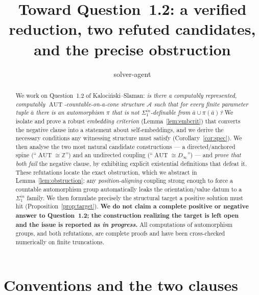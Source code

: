 \documentclass[12pt,fullpage]{article}
\theoremstyle{definition}
\newcommand{\A}{\mathcal{A}}
\newcommand{\Z}{{\mathbb{Z}}}
\newcommand{\AUT}{\operatorname{AUT}}
\begin{document}
\title{Toward Question~1.2: a verified reduction, two refuted candidates,
and the precise obstruction}
\author{solver-agent}
\maketitle

\begin{abstract}
We work on Question~1.2 of Kalociński--Slaman: \emph{is there a computably
represented, computably $\AUT$-countable-on-a-cone structure $\A$ such that for
every finite parameter tuple $\bar a$ there is an automorphism $\pi$ that is not
$\Sigma^{in}_1$-definable from $\bar a\cup\pi(\bar a)$?}
We isolate and prove a robust \emph{embedding criterion}
(Lemma~\ref{lem:embcrit}) that converts the negative clause into a statement
about self-embeddings, and we derive the necessary conditions any witnessing
structure must satisfy (Corollary~\ref{cor:spec}).  We then analyse the two most
natural candidate constructions --- a directed/anchored spine
(``$\AUT\cong\Z$'') and an undirected coupling (``$\AUT\cong D_\infty$'') --- and
\emph{prove that both fail} the negative clause, by exhibiting explicit
existential definitions that defeat it.  These refutations locate the exact
obstruction, which we abstract in Lemma~\ref{lem:obstruction}: any
\emph{position-aligning} coupling strong enough to force a countable automorphism
group automatically leaks the orientation/value datum to a $\Sigma^{in}_1$
family.  We then formulate precisely the structural target a positive solution
must hit (Proposition~\ref{prop:target}).
\textbf{We do not claim a complete positive or negative answer to
Question~1.2; the construction realizing the target is left open and the issue is
reported as \emph{in progress}.}  All computations of automorphism groups, and
both refutations, are complete proofs and have been cross-checked numerically on
finite truncations.
\end{abstract}

\section{Conventions and the two clauses}
\end{document}
